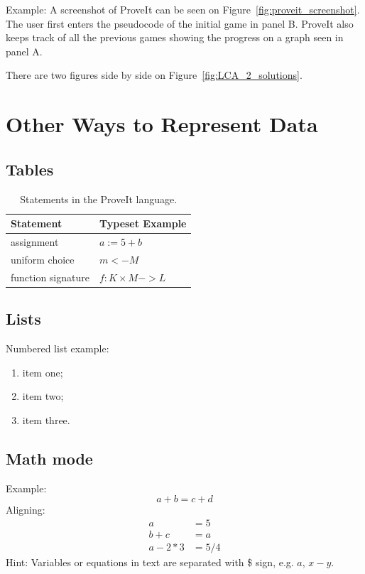 \documentclass[12pt]{article}
\newcommand{\proveit}{ProveIt\xspace}
\begin{document}
Example: A screenshot of \proveit can be seen on Figure~\ref{fig:proveit_screenshot}. The user first enters the pseudocode of the initial game in panel B. \proveit also keeps track of all the previous games showing the progress on a graph seen in panel A.

There are two figures side by side on Figure~\ref{fig:LCA_2_solutions}.



\clearpage %
\section{Other Ways to Represent Data}

\subsection{Tables}

\begin{table}[h]
\centering
\caption{Statements in the \proveit language.}
\begin{tabular}{| l | l |}
	\hline
	\bf{Statement} & \bf{Typeset Example} \\
	\hline
	assignment & $a := 5 + b$ \\
	\hline
	uniform choice & $m <- M$ \\
	\hline
	function signature & $f : K \times M -> L$\\
	\hline
\end{tabular}
\label{tab:statements}
\end{table}


\subsection{Lists}

Numbered list example:
\begin{enumerate}
	\item item one; 
	\item item two;
	\item item three.
\end{enumerate} 

\subsection{Math mode}
Example:
\begin{equation}
a + b = c + d
\end{equation}
Aligning:
\begin{align*}
	a &= 5 \\
	b + c &= a \\
	a -2*3 &= 5/4
\end{align*}
Hint: Variables or equations in text are separated with \$ sign, e.g. $a$, $x - y$.
\end{document}

